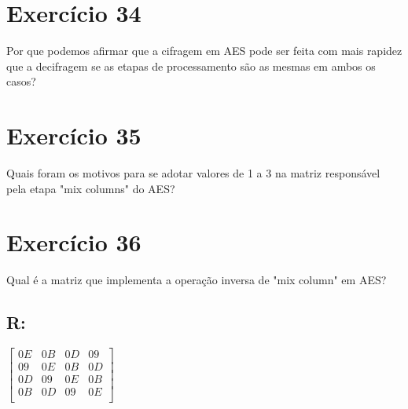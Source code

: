 \documentclass[10pt,a4paper]{article}
\begin{document}
\section*{Exercício 34}
Por que podemos afirmar que a cifragem em AES pode ser feita com mais rapidez que a decifragem se as etapas de processamento são as mesmas em ambos os casos?
\section*{Exercício 35}
Quais foram os motivos para se adotar valores de 1 a 3 na matriz responsável pela etapa "mix columns" do AES?
\section*{Exercício 36}
Qual é a matriz que implementa a operação inversa de "mix column" em AES?
\subsection*{R:}
$\left[\begin{array}{cccc}
0E&0B&0D&09 \\
09&0E&0B&0D \\
0D&09&0E&0B \\
0B&0D&09&0E \\
\end{array} \right]$
\end{document}
